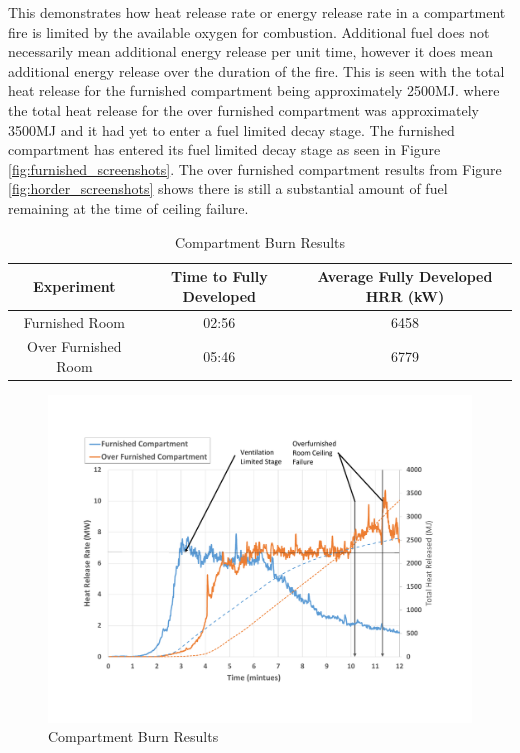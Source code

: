 \documentclass{article}
\begin{document}
This demonstrates how heat release rate or energy release rate in a compartment fire is limited by the available oxygen for combustion. Additional fuel does not necessarily mean additional energy release per unit time, however it does mean additional energy release over the duration of the fire. This is seen with the total heat release for the furnished compartment being approximately 2500MJ. where the total heat release for the over furnished compartment was approximately 3500MJ and it had yet to enter a fuel limited decay stage. The furnished compartment has entered its fuel limited decay stage as seen in Figure \ref{fig:furnished_screenshots}. The over furnished compartment results from Figure \ref{fig:horder_screenshots} shows there is still a substantial amount of fuel remaining at the time of ceiling failure. 

\begin{table}[H]
	\caption{Compartment Burn Results}
	\begin{tabular}{|c|c|c|}
		\hline
		\textbf{Experiment} & \textbf{Time to Fully Developed} & \textbf{Average Fully Developed HRR (kW)} \\ \hline \hline
		Furnished Room & 02:56 & 6458 \\ \hline
		Over Furnished Room & 05:46 & 6779 \\ \hline
	\end{tabular}
	\label{table:comp_burn_results}
\end{table}

\begin{figure}[H]
	\centering
	\includegraphics[width=5in]{0_Images/Vent_Limited_Room/Compartment_Burn_Chart.pdf}
	\caption{Compartment Burn Results}
	\label{fig:comp_burn_chart}
\end{figure}
\end{document}
